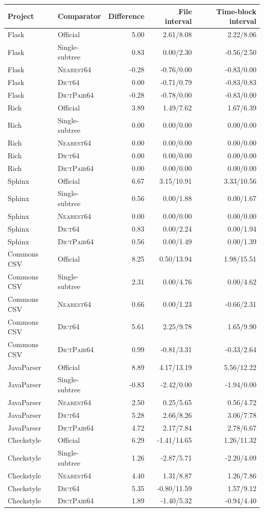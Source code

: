 \begin{longtable}{llrrr}
\toprule
Project & Comparator & Difference & File interval & Time-block interval \\
\midrule\endhead
Flask & Official & 5.00 & 2.61/8.08 & 2.22/8.06 \\
Flask & Single-subtree & 0.83 & 0.00/2.30 & -0.56/2.50 \\
Flask & \textsc{Nearest64} & -0.28 & -0.76/0.00 & -0.83/0.00 \\
Flask & \textsc{Dict64} & 0.00 & -0.71/0.79 & -0.83/0.83 \\
Flask & \textsc{DictPair64} & -0.28 & -0.78/0.00 & -0.83/0.00 \\
Rich & Official & 3.89 & 1.49/7.62 & 1.67/6.39 \\
Rich & Single-subtree & 0.00 & 0.00/0.00 & 0.00/0.00 \\
Rich & \textsc{Nearest64} & 0.00 & 0.00/0.00 & 0.00/0.00 \\
Rich & \textsc{Dict64} & 0.00 & 0.00/0.00 & 0.00/0.00 \\
Rich & \textsc{DictPair64} & 0.00 & 0.00/0.00 & 0.00/0.00 \\
Sphinx & Official & 6.67 & 3.15/10.91 & 3.33/10.56 \\
Sphinx & Single-subtree & 0.56 & 0.00/1.88 & 0.00/1.67 \\
Sphinx & \textsc{Nearest64} & 0.00 & 0.00/0.00 & 0.00/0.00 \\
Sphinx & \textsc{Dict64} & 0.83 & 0.00/2.24 & 0.00/1.94 \\
Sphinx & \textsc{DictPair64} & 0.56 & 0.00/1.49 & 0.00/1.39 \\
Commons CSV & Official & 8.25 & 0.50/13.94 & 1.98/15.51 \\
Commons CSV & Single-subtree & 2.31 & 0.00/4.76 & 0.00/4.62 \\
Commons CSV & \textsc{Nearest64} & 0.66 & 0.00/1.23 & -0.66/2.31 \\
Commons CSV & \textsc{Dict64} & 5.61 & 2.25/9.78 & 1.65/9.90 \\
Commons CSV & \textsc{DictPair64} & 0.99 & -0.81/3.31 & -0.33/2.64 \\
JavaParser & Official & 8.89 & 4.17/13.19 & 5.56/12.22 \\
JavaParser & Single-subtree & -0.83 & -2.42/0.00 & -1.94/0.00 \\
JavaParser & \textsc{Nearest64} & 2.50 & 0.25/5.65 & 0.56/4.72 \\
JavaParser & \textsc{Dict64} & 5.28 & 2.66/8.26 & 3.06/7.78 \\
JavaParser & \textsc{DictPair64} & 4.72 & 2.17/7.84 & 2.78/6.67 \\
Checkstyle & Official & 6.29 & -1.41/14.65 & 1.26/11.32 \\
Checkstyle & Single-subtree & 1.26 & -2.87/5.71 & -2.20/4.09 \\
Checkstyle & \textsc{Nearest64} & 4.40 & 1.31/8.87 & 1.26/7.86 \\
Checkstyle & \textsc{Dict64} & 5.35 & -0.80/11.59 & 1.57/9.12 \\
Checkstyle & \textsc{DictPair64} & 1.89 & -1.40/5.32 & -0.94/4.40 \\
\bottomrule
\end{longtable}
